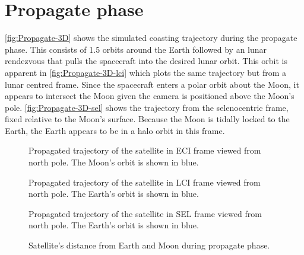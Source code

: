 
\clearpage 


\section{Propagate phase} \label{sec:Propagate}

\autoref{fig:Propagate-3D} shows the simulated coasting trajectory during the propagate phase. This consists of 1.5 orbits around the Earth followed by an lunar rendezvous that pulls the spacecraft into the desired lunar orbit. This orbit is apparent in \autoref{fig:Propagate-3D-lci} which plots the same trajectory but from a lunar centred frame. Since the spacecraft enters a polar orbit about the Moon, it appears to intersect the Moon given the camera is positioned above the Moon's pole. \autoref{fig:Propagate-3D-sel} shows the trajectory from the selenocentric frame, fixed relative to the Moon's surface. Because the Moon is tidally locked to the Earth, the Earth appears to be in a halo orbit in this frame.

\begin{figure}[h]
\centering
\def\svgwidth{\figurewidth}

\caption{Propagated trajectory of the satellite in ECI frame viewed from north pole. The Moon's orbit is shown in blue.} \label{fig:Propagate-3D}
\end{figure}

\begin{figure}
\centering
\def\svgwidth{\figurewidth}

\caption{Propagated trajectory of the satellite in LCI frame viewed from north pole. The Earth's orbit is shown in blue.} \label{fig:Propagate-3D-lci}
\end{figure}

\begin{figure}
\centering
\def\svgwidth{\figurewidth}

\caption{Propagated trajectory of the satellite in SEL frame viewed from north pole. The Earth's orbit is shown in blue.} \label{fig:Propagate-3D-sel}
\end{figure}

\begin{figure}
\centering
\def\svgwidth{\figurewidth}

\caption{Satellite's distance from Earth and Moon during propagate phase.} \label{fig:Propagate-dist}
\end{figure}

